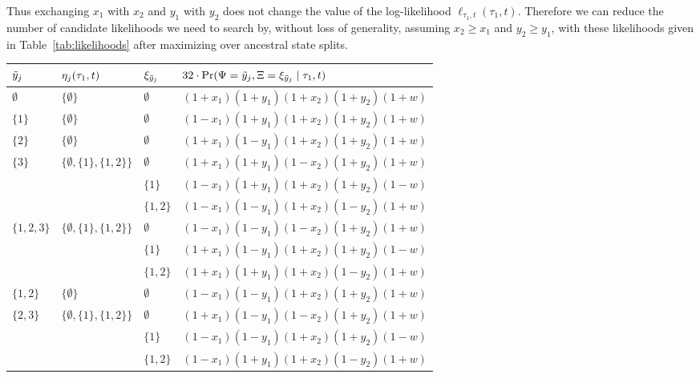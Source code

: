 Thus exchanging $x_1$ with $x_2$ and $y_1$ with $y_2$ does not change the value of the log-likelihood $\ell_{\tau_1,t}(\tau_1, t)$.
Therefore we can reduce the number of candidate likelihoods we need to search by, without loss of generality, assuming $x_2 \ge x_1$ and $y_2 \ge y_1$, with these likelihoods given in Table~\ref{tab:likelihoods} after maximizing over ancestral state splits.

\begin{table}
\centering
\begin{tabular}{|lll|l|}
\hline
$\tilde{y}_j$ & $\eta_j(\tau_1, t)$ & $\xi_{\tilde{y}_j}$ & $32\cdot\Pr(\Psi=\tilde{y}_j,\Xi=\xi_{\tilde{y}_j} \mid \tau_1,t)$\\
\hline
$\emptyset$&$\{\emptyset\}$&$\emptyset$&$(1+x_1)(1+y_1)(1+x_2)(1+y_2)(1+w)$\\

$\{1\}$    &$\{\emptyset\}$&$\emptyset$&$(1-x_1)(1+y_1)(1+x_2)(1+y_2)(1+w)$\\

$\{2\}$    &$\{\emptyset\}$&$\emptyset$&$(1+x_1)(1-y_1)(1+x_2)(1+y_2)(1+w)$\\

$\{3\}$    &$\{\emptyset,\{1\},\{1,2\}\}$&$\emptyset$&$(1+x_1)(1+y_1)(1-x_2)(1+y_2)(1+w)$\\
&&$\{1\}$&$(1-x_1)(1+y_1)(1+x_2)(1+y_2)(1-w)$\\
&&$\{1,2\}$&$(1-x_1)(1-y_1)(1+x_2)(1-y_2)(1+w)$\\

$\{1,2,3\}$&$\{\emptyset,\{1\},\{1,2\}\}$&$\emptyset$&$(1-x_1)(1-y_1)(1-x_2)(1+y_2)(1+w)$\\
&&$\{1\}$&$(1+x_1)(1-y_1)(1+x_2)(1+y_2)(1-w)$\\
&&$\{1,2\}$&$(1+x_1)(1+y_1)(1+x_2)(1-y_2)(1+w)$\\

$\{1,2\}$  &$\{\emptyset\}$&$\emptyset$&$(1-x_1)(1-y_1)(1+x_2)(1+y_2)(1+w)$\\

$\{2,3\}$  &$\{\emptyset,\{1\},\{1,2\}\}$&$\emptyset$&$(1+x_1)(1-y_1)(1-x_2)(1+y_2)(1+w)$\\
&&$\{1\}$&$(1-x_1)(1-y_1)(1+x_2)(1+y_2)(1-w)$\\
&&$\{1,2\}$&$(1-x_1)(1+y_1)(1+x_2)(1-y_2)(1+w)$\\


\end{tabular}
\end{table}
